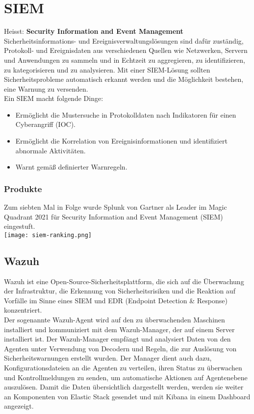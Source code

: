\section{SIEM}
Heisst: \textbf{Security Information and Event Management}\\

Sicherheitsinformations- und Ereignisverwaltungslösungen sind dafür zuständig, Protokoll- und Ereignisdaten aus verschiedenen Quellen wie Netzwerken, Servern und Anwendungen zu sammeln und in Echtzeit zu aggregieren, zu identifizieren, zu kategorisieren und zu analysieren.
Mit einer SIEM-Lösung sollten Sicherheitsprobleme automatisch erkannt werden und die Möglichkeit bestehen, eine Warnung zu versenden.\\

Ein SIEM macht folgende Dinge:
\begin{itemize}
  \item Ermöglicht die Mustersuche in Protokolldaten nach Indikatoren für einen Cyberangriff (IOC).
  \item Ermöglicht die Korrelation von Ereignisinformationen und identifiziert abnormale Aktivitäten.
  \item Warnt gemäß definierter Warnregeln.
\end{itemize}

\subsubsection{Produkte}
Zum siebten Mal in Folge wurde Splunk von Gartner als Leader im Magic Quadrant 2021 für Security Information and Event Management (SIEM) eingestuft.\\
\texttt{[image: siem-ranking.png]}

\subsection{Wazuh}
Wazuh ist eine Open-Source-Sicherheitsplattform, die sich auf die Überwachung der Infrastruktur, die Erkennung von Sicherheitsrisiken und die Reaktion auf Vorfälle im Sinne eines SIEM und EDR (Endpoint Detection \& Response) konzentriert.\\

Der sogenannte Wazuh-Agent wird auf den zu überwachenden Maschinen installiert und kommuniziert mit dem Wazuh-Manager, der auf einem Server installiert ist.
Der Wazuh-Manager empfängt und analysiert Daten von den Agenten unter Verwendung von Decodern und Regeln, die zur Auslösung von Sicherheitswarnungen erstellt wurden.
Der Manager dient auch dazu, Konfigurationsdateien an die Agenten zu verteilen, ihren Status zu überwachen und Kontrollmeldungen zu senden, um automatische Aktionen auf Agentenebene auszulösen.
Damit die Daten übersichtlich dargestellt werden, werden sie weiter an Komponenten von Elastic Stack gesendet und mit Kibana in einem Dashboard angezeigt.

